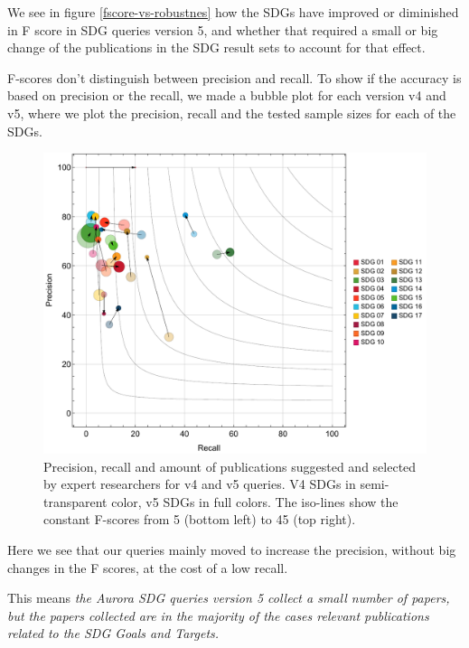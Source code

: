 \documentclass{article}
\begin{document}
We see in figure \ref{fscore-vs-robustnes} how the SDGs have improved or diminished in F score in SDG queries version 5, and whether that required a small or big change of the publications in the SDG result sets to account for that effect.

F-scores don't distinguish between precision and recall. To show if the accuracy is based on precision or the recall, we made a bubble plot for each version v4 and v5, where we plot the precision, recall and the tested sample sizes for each of the SDGs. 



\begin{figure}[H]
	\centering
  \includegraphics[width=\textwidth]{figures/bubblechart2.pdf}
	\caption{Precision, recall and amount of publications suggested and selected by expert researchers for v4 and v5 queries. V4 SDGs in semi-transparent color, v5 SDGs in full colors. The iso-lines show the constant F-scores from 5 (bottom left) to 45 (top right). }
	\label{bubblechart}
\end{figure}

Here we see that our queries mainly moved to increase the precision, without big changes in the F scores, at the cost of a low recall. 

This means \emph{the Aurora SDG queries version 5 collect a small number of papers, but the papers collected are in the majority of the cases relevant publications related to the SDG Goals and Targets.}
\end{document}
